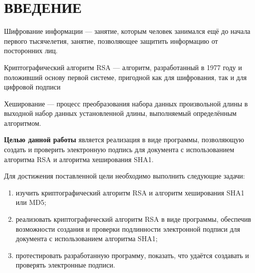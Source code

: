 \chapter*{ВВЕДЕНИЕ}

Шифрование информации --- занятие, которым человек занимался ещё до начала первого тысячелетия, занятие, позволяющее защитить информацию от посторонних лиц. 

Криптографический алгоритм RSA --- алгоритм, разработанный в 1977 году и положивший основу первой системе, пригодной как для шифрования, так и для цифровой подписи

Хеширование --- процесс преобразования набора данных произвольной длины в выходной набор данных установленной длины, выполняемый определённым алгоритмом.

\textbf{Целью данной работы} является реализация в виде программы, позволяющую создать и проверить электронную подпись для документа с использованием алгоритма RSA и алгоритма хеширования SHA1.

Для достижения поставленной цели необходимо выполнить следующие задачи:
\begin{enumerate}[label=---]
	\item изучить криптографический алгоритм RSA и алгоритм хеширования SHA1 или MD5;
	\item реализовать криптографический алгоритм RSA в виде программы, обеспечив возможности создания и проверки подлинности электронной подписи для документа с использованием алгоритма SHA1;
	\item протестировать разработанную программу, показать, что удаётся создавать и проверять электронные подписи.
\end{enumerate}